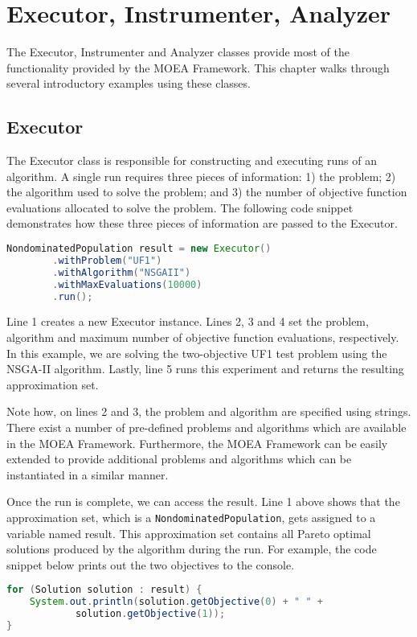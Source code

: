 \chapter{Executor, Instrumenter, Analyzer}

The Executor, Instrumenter and Analyzer classes provide most of the functionality provided by the MOEA Framework.  This chapter walks through several introductory examples using these classes.

\section{Executor}
The Executor class is responsible for constructing and executing runs of an algorithm.  A single run requires three pieces of information: 1) the problem; 2) the algorithm used to solve the problem; and 3) the number of objective function evaluations allocated to solve the problem.  The following code snippet demonstrates how these three pieces of information are passed to the Executor.

\begin{lstlisting}[language=Java]
NondominatedPopulation result = new Executor()
		.withProblem("UF1")
		.withAlgorithm("NSGAII")
		.withMaxEvaluations(10000)
		.run();
\end{lstlisting}

Line 1 creates a new Executor instance.  Lines 2, 3 and 4 set the problem, algorithm and maximum number of objective function evaluations, respectively.  In this example, we are solving the two-objective UF1 test problem using the NSGA-II algorithm.  Lastly, line 5 runs this experiment and returns the resulting approximation set.

Note how, on lines 2 and 3, the problem and algorithm are specified using strings.  There exist a number of pre-defined problems and algorithms which are available in the MOEA Framework.  Furthermore, the MOEA Framework can be easily extended to provide additional problems and algorithms which can be instantiated in a similar manner.

Once the run is complete, we can access the result.  Line 1 above shows that the approximation set, which is a \texttt{NondominatedPopulation}, gets assigned to a variable named result.  This approximation set contains all Pareto optimal solutions produced by the algorithm during the run.  For example, the code snippet below prints out the two objectives to the console.

\begin{lstlisting}[language=Java]
for (Solution solution : result) {
	System.out.println(solution.getObjective(0) + " " +
			solution.getObjective(1));
}
\end{lstlisting}

